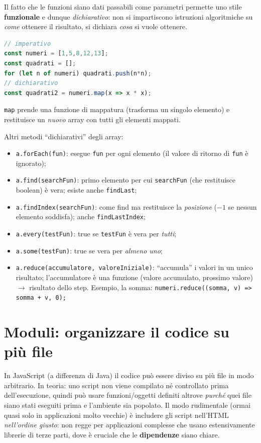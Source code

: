 Il fatto che le funzioni siano dati passabili come parametri permette uno stile
\textbf{funzionale} e dunque \emph{dichiarativo}: non si impartiscono istruzioni
algoritmiche su \emph{come} ottenere il risultato, si dichiara \emph{cosa} si vuole ottenere.
\begin{esempio}
\begin{lstlisting}[language=JavaScript]
// imperativo
const numeri = [1,5,8,12,13];
const quadrati = [];
for (let n of numeri) quadrati.push(n*n);
// dichiarativo
const quadrati2 = numeri.map(x => x * x);
\end{lstlisting}
\texttt{map} prende una funzione di mappatura (trasforma un singolo elemento) e restituisce
un \emph{nuovo} array con tutti gli elementi mappati.
\end{esempio}

Altri metodi ``dichiarativi'' degli array:
\begin{itemize}
  \item \texttt{a.forEach(fun)}: esegue \texttt{fun} per ogni elemento (il valore di ritorno
        di \texttt{fun} \`e ignorato);
  \item \texttt{a.find(searchFun)}: primo elemento per cui \texttt{searchFun} (che restituisce
        boolean) \`e vera; esiste anche \texttt{findLast};
  \item \texttt{a.findIndex(searchFun)}: come find ma restituisce la \emph{posizione}
        ($-1$ se nessun elemento soddisfa); anche \texttt{findLastIndex};
  \item \texttt{a.every(testFun)}: true se \texttt{testFun} \`e vera per \emph{tutti};
  \item \texttt{a.some(testFun)}: true se vera per \emph{almeno uno};
  \item \texttt{a.reduce(accumulatore, valoreIniziale)}: ``accumula'' i valori in un unico
        risultato; l'accumulatore \`e una funzione (valore accumulato, prossimo valore)
        $\rightarrow$ risultato dello step. Esempio, la somma:
        \texttt{numeri.reduce((somma, v) => somma + v, 0);}
\end{itemize}

\section{Moduli: organizzare il codice su pi\`u file}

In JavaScript (a differenza di Java) il codice pu\`o essere diviso su pi\`u file in modo
arbitrario. In teoria: uno script non viene compilato n\'e controllato prima dell'esecuzione,
quindi pu\`o usare funzioni/oggetti definiti altrove \emph{purch\'e} quei file siano stati
eseguiti prima e l'ambiente sia popolato. Il modo rudimentale (ormai quasi solo in
applicazioni molto vecchie) \`e includere gli script nell'HTML \emph{nell'ordine giusto}: non
regge per applicazioni complesse che usano estensivamente librerie di terze parti, dove
\`e cruciale che le \textbf{dipendenze} siano chiare.

